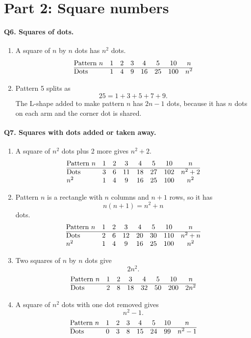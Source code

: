 \documentclass[11pt,a4paper]{article}
\begin{document}
\section*{Part 2: Square numbers}

\paragraph{Q6. Squares of dots.}
\begin{enumerate}[label=(\alph*),leftmargin=*,itemsep=4pt]
\item A square of \(n\) by \(n\) dots has \(n^2\) dots.
\[
\begin{array}{@{}lccccccc@{}}
\text{Pattern }n&1&2&3&4&5&10&n\\ \hline
\text{Dots}&1&4&9&16&25&100&n^2
\end{array}
\]

\item Pattern 5 splits as
\[
25=1+3+5+7+9.
\]
The L-shape added to make pattern \(n\) has \(2n-1\) dots, because it has \(n\) dots on each arm and the corner dot is shared.
\end{enumerate}

\paragraph{Q7. Squares with dots added or taken away.}
\begin{enumerate}[label=(\alph*),leftmargin=*,itemsep=4pt]
\item A square of \(n^2\) dots plus 2 more gives \(n^2+2\).
\[
\begin{array}{@{}lccccccc@{}}
\text{Pattern }n&1&2&3&4&5&10&n\\ \hline
\text{Dots}&3&6&11&18&27&102&n^2+2\\
n^2&1&4&9&16&25&100&n^2
\end{array}
\]

\item Pattern \(n\) is a rectangle with \(n\) columns and \(n+1\) rows, so it has
\[
n(n+1)=n^2+n
\]
dots.
\[
\begin{array}{@{}lccccccc@{}}
\text{Pattern }n&1&2&3&4&5&10&n\\ \hline
\text{Dots}&2&6&12&20&30&110&n^2+n\\
n^2&1&4&9&16&25&100&n^2
\end{array}
\]

\item Two squares of \(n\) by \(n\) dots give
\[
2n^2.
\]
\[
\begin{array}{@{}lccccccc@{}}
\text{Pattern }n&1&2&3&4&5&10&n\\ \hline
\text{Dots}&2&8&18&32&50&200&2n^2
\end{array}
\]

\item A square of \(n^2\) dots with one dot removed gives
\[
n^2-1.
\]
\[
\begin{array}{@{}lccccccc@{}}
\text{Pattern }n&1&2&3&4&5&10&n\\ \hline
\text{Dots}&0&3&8&15&24&99&n^2-1
\end{array}
\]
\end{enumerate}
\end{document}
